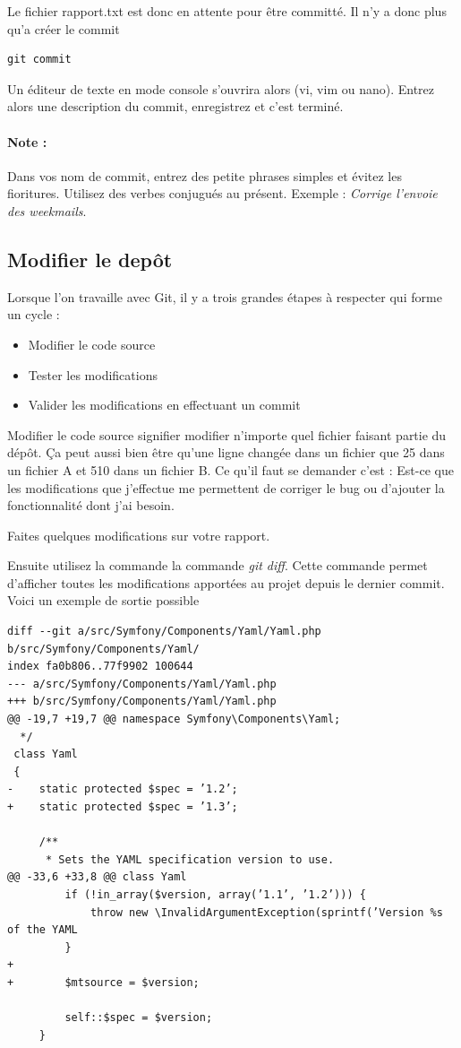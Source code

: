 \documentclass[a4paper]{article}
\begin{document}
Le fichier rapport.txt est donc en attente pour être committé. Il n'y a donc plus qu'a créer le commit

\begin{verbatim}
git commit
\end{verbatim}

Un éditeur de texte en mode console s'ouvrira alors (vi, vim ou nano). Entrez alors une description du commit, enregistrez et c'est terminé.

\paragraph{Note :}Dans vos nom de commit, entrez des petite phrases simples et évitez les fioritures. Utilisez des verbes conjugués au présent. Exemple : \textit{Corrige l'envoie des weekmails}.

\subsection{Modifier le dep\^ot}

Lorsque l'on travaille avec Git, il y a trois grandes étapes à respecter qui forme un cycle : 
\begin{itemize}
\item Modifier le code source
\item Tester les modifications
\item Valider les modifications en effectuant un commit
\end{itemize}

Modifier le code source signifier modifier n'importe quel fichier faisant partie du dép\^ot. Ça peut aussi bien être qu'une ligne changée dans un fichier que 25 dans un fichier A et 510 dans un fichier B. Ce qu'il faut se demander c'est : Est-ce que les modifications que j'effectue me permettent de corriger le bug ou d'ajouter la fonctionnalité dont j'ai besoin.

Faites quelques modifications sur votre rapport.

Ensuite utilisez la commande la commande \textit{git diff}. Cette commande permet d'afficher toutes les modifications apportées au projet depuis le dernier commit. Voici un exemple de sortie possible

\begin{verbatim}
diff --git a/src/Symfony/Components/Yaml/Yaml.php b/src/Symfony/Components/Yaml/
index fa0b806..77f9902 100644
--- a/src/Symfony/Components/Yaml/Yaml.php
+++ b/src/Symfony/Components/Yaml/Yaml.php
@@ -19,7 +19,7 @@ namespace Symfony\Components\Yaml;
  */
 class Yaml
 {
-    static protected $spec = ’1.2’;
+    static protected $spec = ’1.3’;

     /**
      * Sets the YAML specification version to use.
@@ -33,6 +33,8 @@ class Yaml
         if (!in_array($version, array(’1.1’, ’1.2’))) {
             throw new \InvalidArgumentException(sprintf(’Version %s of the YAML
         }
+
+        $mtsource = $version;

         self::$spec = $version;
     }
\end{verbatim}
\end{document}
